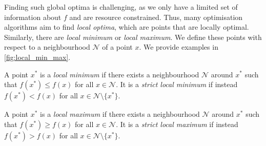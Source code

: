 Finding such global optima is challenging, as we only have a limited set of information about $f$ and are resource constrained. Thus, many optimisation algorithms aim to find \textit{local optima}, which are points that are locally optimal. Similarly, there are \textit{local minimum} or \textit{local maximum}. We define these points with respect to a neighbourhood $\mathcal{N}$ of a point $x$. We provide examples in \cref{fig:local_min_max}.

\begin{definition}
    A point $x^*$ is a \textit{local minimum} if there exists a neighbourhood $\mathcal{N}$ around $x^*$ such that $f(x^*) \leq f(x)$ for all $x \in \mathcal{N}$. It is a \textit{strict local minimum} if instead $f(x^*) < f(x)$ for all $x \in \mathcal{N} \setminus \{x^*\}$.
\end{definition}

\begin{definition}
    A point $x^*$ is a \textit{local maximum} if there exists a neighbourhood $\mathcal{N}$ around $x^*$ such that $f(x^*) \geq f(x)$ for all $x \in \mathcal{N}$. It is a \textit{strict local maximum} if instead $f(x^*) > f(x)$ for all $x \in \mathcal{N} \setminus \{x^*\}$.
\end{definition}

